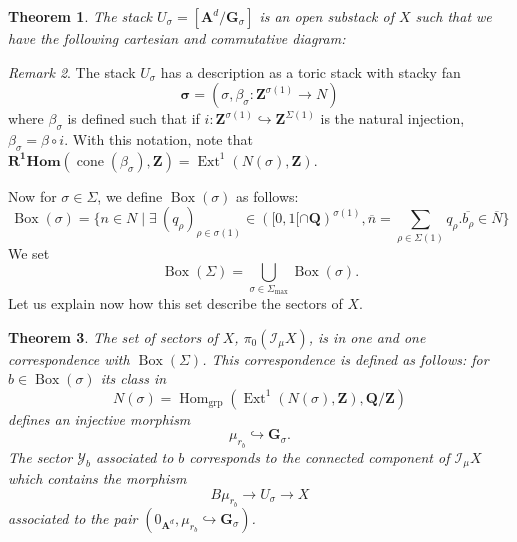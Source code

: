 \documentclass{proc-l}
\newcommand{\Z}{\mathbf{Z}}
\newcommand{\Q}{\mathbf{Q}}
\newcommand{\G}{\mathbf{G}}
\DeclareMathOperator{\grp}{grp}
\DeclareMathOperator{\Hom}{Hom}
\DeclareMathOperator{\Ext}{Ext}
\DeclareMathOperator{\coneform}{cone}
\DeclareMathOperator{\Boxe}{Box}
\newcommand{\stackY}{\mathcal{Y}}
\newcommand{\stackT}{\mathcal{T}}
\newcommand{\affine}{\mathbf{A}}
\newcommand{\sheafI}{\mathcal{I}}
\newcommand{\sector}{\pi_0(\sheafI_{\mu} X)}
\newtheorem{theorem}{Theorem}[section]
\theoremstyle{definition}
\theoremstyle{remark}
\newtheorem{remark}[theorem]{Remark}
\numberwithin{equation}{section}
\begin{document}
\begin{theorem}
    The stack $U_{\sigma} = [\affine^d / \G_{\sigma} ]$ is an open substack of $X$ such that we have the following cartesian and commutative diagram:
    \begin{center}
    \end{center}
\end{theorem}

\begin{remark}
    The stack $U_{\sigma}$ has a description as a toric stack with stacky fan $$\mathbf{\sigma} = (\sigma, \beta_{\sigma} : \Z^{\sigma(1)} \rightarrow N) $$ where $\beta_{\sigma}$ is defined such that if $i : \Z^{\sigma(1)} \hookrightarrow \Z^{\Sigma(1)}$ is the natural injection, $\beta_{\sigma} = \beta \circ i$. With this notation, note that $\mathbf{R^1 Hom}(\coneform(\beta_{\sigma}),\Z) = \Ext^1(N(\sigma),\Z)$.
\end{remark}

Now for $\sigma \in \Sigma$, we define $\Boxe(\sigma)$ as follows:
\begin{equation}
    \Boxe(\sigma) = \{ n \in N \mid \exists \ (q_{\rho})_{\rho \in \sigma(1)} \in \left( [0,1[ \cap \Q \right)^{\sigma(1)}, \overline{n} = \sum\limits_{\rho \in \Sigma(1)} q_{\rho} . \overline{b_{\rho}} \in \overline{N} \}
\end{equation}We set $$\Boxe(\Sigma) = \bigcup\limits_{\sigma \in \Sigma_{\max}} \Boxe(\sigma) .$$Let us explain now how this set describe the sectors of $X$.

\begin{theorem}\label{theorem_description_sector_box_element}
    The set of sectors of $X$, $\sector$, is in one and one correspondence with $\Boxe(\Sigma)$. This correspondence is defined as follows: for $b \in \Boxe(\sigma)$ its class in $$N(\sigma) = \Hom_{\grp}(\Ext^1(N(\sigma),\Z),\Q/\Z)$$defines an injective morphism $$\mu_{r_b} \hookrightarrow \G_{\sigma} .$$The sector $\stackY_b$ associated to $b$ corresponds to the connected component of $\sheafI_{\mu} X$ which contains the morphism $$B \mu_{r_b} \rightarrow U_{\sigma} \rightarrow X$$associated to the pair $(0_{\affine^d},\mu_{r_b} \hookrightarrow \G_{\sigma})$.
\end{theorem}
\end{document}
